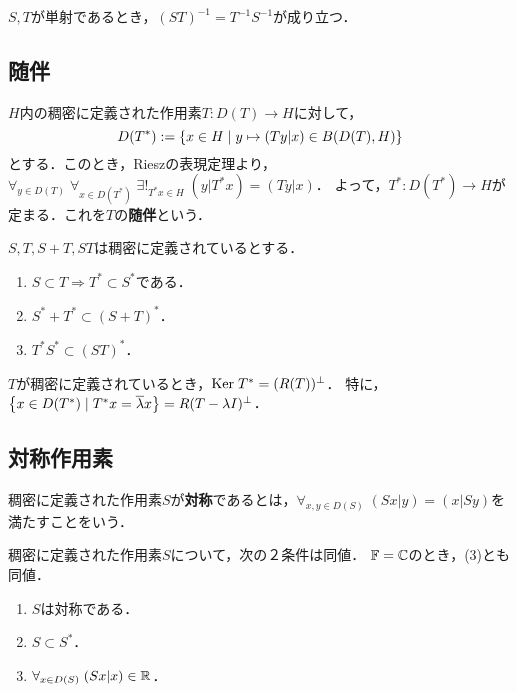 \documentclass[uplatex,dvipdfmx]{jsreport}
\begin{document}
\begin{lemma}
    $S,T$が単射であるとき，$(ST)^{-1}=T^{-1}S^{-1}$が成り立つ．
\end{lemma}

\subsection{随伴}

\begin{definition}
    $H$内の稠密に定義された作用素$T:D(T)\to H$に対して，
    \[D(T^*):=\left\{x\in H\mid y\mapsto(Ty|x)\in B(D(T),H)\right\}\]
    とする．このとき，Rieszの表現定理より，$\forall_{y\in D(T)}\;\forall_{x\in D(T^*)}\;\exists!_{T^*x\in H}\;(y|T^*x)=(Ty|x)$．
    よって，$T^*:D(T^*)\to H$が定まる．これを$T$の\textbf{随伴}という．
\end{definition}

\begin{lemma}
    $S,T,S+T,ST$は稠密に定義されているとする．
    \begin{enumerate}
        \item $S\subset T\Rightarrow T^*\subset S^*$である．
        \item $S^*+T^*\subset(S+T)^*$．
        \item $T^*S^*\subset(ST)^*$．
    \end{enumerate}
\end{lemma}

\begin{lemma}
    $T$が稠密に定義されているとき，$\mathrm{Ker}\; T^*=(R(T))^\perp$．
    特に，$\left\{x\in D(T^*)\mid T^*x=\overline{\lambda}x\right\}=R(T-\lambda I)^\perp$．
\end{lemma}

\subsection{対称作用素}

\begin{definition}[symmetric]
    稠密に定義された作用素$S$が\textbf{対称}であるとは，$\forall_{x,y\in D(S)}\;(Sx|y)=(x|Sy)$を満たすことをいう．
\end{definition}

\begin{lemma}[対称作用素の随伴による特徴付け]
    稠密に定義された作用素$S$について，次の２条件は同値．
    $\mathbb{F}=\mathbb{C}$のとき，(3)とも同値．
    \begin{enumerate}
        \item $S$は対称である．
        \item $S\subset S^*$．
        \item $\forall_{x\in D(S)}\;(Sx|x)\in\mathbb{R}$．
    \end{enumerate}
\end{lemma}
\end{document}
